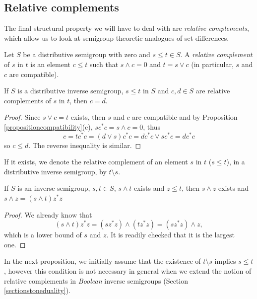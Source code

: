 \subsection{Relative complements}

The final structural property we will have to deal with are \emph{relative complements}, which allow us to look at semigroup-theoretic analogues of set differences.

\begin{definition}\label{definitionrelativecomplementdistributive}
Let $S$ be a distributive semigroup with zero and $s\leq t\in S$. A \emph{relative complement} of $s$ in $t$ is an element $c\leq t$ such that $s\land c=0$ and $t=s\lor c$ (in particular, $s$ and $c$ are compatible).
\end{definition}

\begin{lemma}
If $S$ is a distributive inverse semigroup, $s\leq t$ in $S$ and $c,d\in S$ are relative complements of $s$ in $t$, then $c=d$.
\end{lemma}
\begin{proof}
Since $s\lor c=t$ exists, then $s$ and $c$ are compatible and by Proposition \ref{propositioncompatibility}(c), $sc^*c=s\land c=0$, thus
\[c=tc^*c=(d\lor s)c^*c=dc^*c\lor sc^*c=dc^*c\]
so $c\leq d$. The reverse inequality is similar.\qedhere
\end{proof}

\begin{definition}
If it exists, we denote the relative complement of an element $s$ in $t$ ($s\leq t$), in a distributive inverse semigroup, by $t\setminus s$.
\end{definition}

\begin{lemma}
If $S$ is an inverse semigroup, $s,t\in S$, $s\land t$ exists and $z\leq t$, then $s\land z$ exists and $s\land z=(s\land t)z^*z$
\end{lemma}
\begin{proof}
We already know that
\[(s\land t)z^*z=(sz^*z)\land (tz^*z)=(sz^*z)\land z,\]
which is a lower bound of $s$ and $z$. It is readily checked that it is the largest one.\qedhere
\end{proof}

In the next proposition, we initially assume that the existence of $t\setminus s$ implies $s\leq t$, however this condition is not necessary in general when we extend the notion of relative complements in \emph{Boolean} inverse semigroups (Section \ref{sectionstoneduality}).

